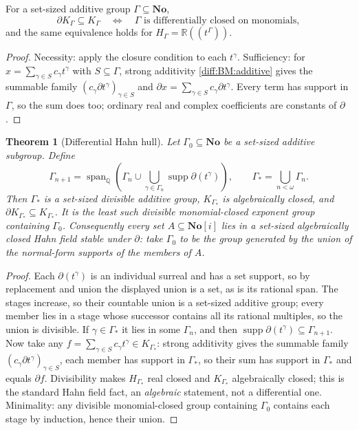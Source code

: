 \documentclass[11pt,letterpaper]{article}
\numberwithin{equation}{section}
\newtheorem{theorem}{Theorem}[section]
\theoremstyle{definition}
\theoremstyle{remark}
\newcommand{\No}{\mathbf{No}}
\newcommand{\SC}{\mathbf{No}[i]}
\newcommand{\R}{\mathbb R}
\newcommand{\Q}{\mathbb Q}
\newcommand{\der}{\partial}
\newcommand{\supp}{\operatorname{supp}}
\newcommand{\Span}{\operatorname{span}}
\begin{document}
\begin{lemma}
\label{diff:lem:monomialcriterion}
For a set-sized additive group $\Gamma\subseteq\No$,
\[
 \der K_{\Gamma}\subseteq K_{\Gamma}
 \quad\Longleftrightarrow\quad
 \Gamma\text{ is differentially closed on monomials},
\]
and the same equivalence holds for $H_{\Gamma}=\R((t^{\Gamma}))$.
\end{lemma}
\begin{proof}
Necessity: apply the closure condition to each $t^{\gamma}$. Sufficiency: for
$x=\sum_{\gamma\in S}c_{\gamma}t^{\gamma}$ with $S\subseteq\Gamma$, strong
additivity \ref{diff:BM:additive} gives the summable family
$(c_{\gamma}\der t^{\gamma})_{\gamma\in S}$ and
$\der x=\sum_{\gamma\in S}c_{\gamma}\der t^{\gamma}$. Every term has support in
$\Gamma$, so the sum does too; ordinary real and complex coefficients are
constants of $\der$.
\end{proof}

\begin{theorem}[Differential Hahn hull]
\label{diff:thm:hull}
Let $\Gamma_{0}\subseteq\No$ be a set-sized additive subgroup. Define
\begin{equation}\label{diff:eq:hullstage}
 \Gamma_{n+1}=\Span_{\Q}\!\left(\Gamma_{n}\cup
 \bigcup_{\gamma\in\Gamma_{n}}\supp\der(t^{\gamma})\right),
 \qquad
 \Gamma_{*}=\bigcup_{n<\omega}\Gamma_{n}.
\end{equation}
Then $\Gamma_{*}$ is a set-sized \emph{divisible} additive group,
$K_{\Gamma_{*}}$ is algebraically closed, and
$\der K_{\Gamma_{*}}\subseteq K_{\Gamma_{*}}$. It is the least such divisible
monomial-closed exponent group containing $\Gamma_{0}$. Consequently every set
$A\subseteq\SC$ lies in a set-sized algebraically closed Hahn field stable
under $\der$: take $\Gamma_{0}$ to be the group generated by the union of the
normal-form supports of the members of $A$.
\end{theorem}
\begin{proof}
Each $\der(t^{\gamma})$ is an individual surreal and has a set support, so by
replacement and union the displayed union is a set, as is its rational span.
The stages increase, so their countable union is a set-sized additive group;
every member lies in a stage whose successor contains all its rational
multiples, so the union is divisible. If $\gamma\in\Gamma_{*}$ it lies in some
$\Gamma_{n}$, and then $\supp\der(t^{\gamma})\subseteq\Gamma_{n+1}$. Now take
any $f=\sum_{\gamma\in S}c_{\gamma}t^{\gamma}\in K_{\Gamma_{*}}$: strong
additivity gives the summable family $(c_{\gamma}\der t^{\gamma})_{\gamma\in S}$,
each member has support in $\Gamma_{*}$, so their sum has support in
$\Gamma_{*}$ and equals $\der f$. Divisibility makes $H_{\Gamma_{*}}$ real
closed and $K_{\Gamma_{*}}$ algebraically closed; this is the standard Hahn
field fact, an \emph{algebraic} statement, not a differential one. Minimality:
any divisible monomial-closed group containing $\Gamma_{0}$ contains each stage
by induction, hence their union.
\end{proof}
\end{document}
